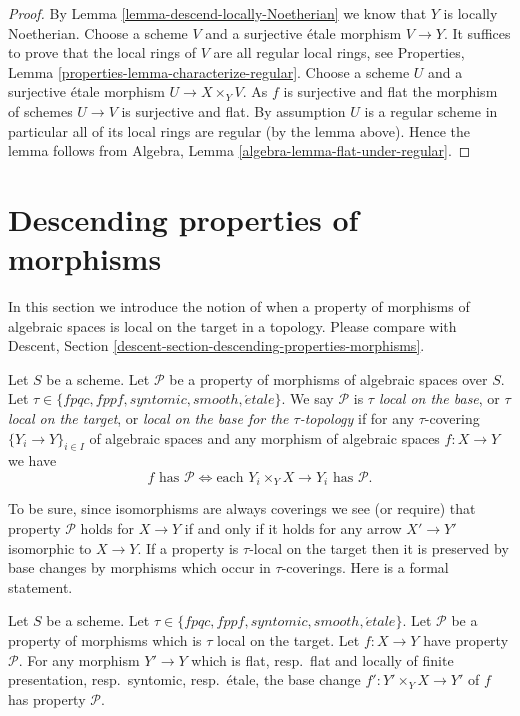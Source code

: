 \begin{proof}
By
Lemma \ref{lemma-descend-locally-Noetherian}
we know that $Y$ is locally Noetherian.
Choose a scheme $V$ and a surjective \'etale morphism $V \to Y$.
It suffices to prove that the local rings of $V$ are all regular local
rings, see
Properties, Lemma \ref{properties-lemma-characterize-regular}.
Choose a scheme $U$ and a surjective \'etale morphism
$U \to X \times_Y V$. As $f$ is surjective and flat the morphism of schemes
$U \to V$ is surjective and flat. By assumption $U$ is a regular scheme
in particular all of its local rings are regular (by the lemma above).
Hence the lemma follows from
Algebra, Lemma \ref{algebra-lemma-flat-under-regular}.
\end{proof}



\section{Descending properties of morphisms}
\label{section-descending-properties-morphisms}

\noindent
In this section we introduce the notion of when a property of morphisms of
algebraic spaces is local on the target in a topology. Please compare with
Descent, Section \ref{descent-section-descending-properties-morphisms}.

\begin{definition}
\label{definition-property-morphisms-local}
Let $S$ be a scheme.
Let $\mathcal{P}$ be a property of morphisms of algebraic spaces over $S$.
Let $\tau \in \{fpqc, fppf, syntomic, smooth, \acute{e}tale\}$.
We say $\mathcal{P}$ is {\it $\tau$ local on the base}, or
{\it $\tau$ local on the target}, or
{\it local on the base for the $\tau$-topology} if for any
$\tau$-covering $\{Y_i \to Y\}_{i \in I}$ of algebraic spaces
and any morphism of algebraic spaces $f : X \to Y$ we 
have
$$
f \text{ has }\mathcal{P}
\Leftrightarrow
\text{each }Y_i \times_Y X \to Y_i\text{ has }\mathcal{P}.
$$
\end{definition}

\noindent
To be sure, since isomorphisms are always coverings
we see (or require) that property $\mathcal{P}$ holds for $X \to Y$
if and only if it holds for any arrow $X' \to Y'$ isomorphic to $X \to Y$.
If a property is $\tau$-local on the target then it is preserved
by base changes by morphisms which occur in $\tau$-coverings. Here
is a formal statement.

\begin{lemma}
\label{lemma-pullback-property-local-target}
Let $S$ be a scheme.
Let $\tau \in \{fpqc, fppf, syntomic, smooth, \acute{e}tale\}$.
Let $\mathcal{P}$ be a property of morphisms which is $\tau$ local
on the target. Let $f : X \to Y$ have property $\mathcal{P}$.
For any morphism $Y' \to Y$ which is
flat, resp.\ flat and locally of finite presentation, resp.\ syntomic,
resp.\ \'etale, the base change
$f' : Y' \times_Y X \to Y'$ of $f$ has property $\mathcal{P}$.
\end{lemma}

